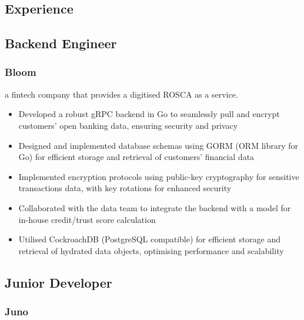 \documentclass{article}
\begin{document}
\begin{paracol}{2}
  \raggedright
  \vspace{3pt}
  \section{Experience}
  \subsection{Backend Engineer}
  \subsubsection{Bloom}
  {\color{LightGrey}\scriptsize\href{https://www.bloommoney.co}{\faExternalLink}}
  \hspace*{\fill}{\color{TitleGrey}{\scriptsize\faCalendar}\hspace{5pt}{\small09/2023 -- Present}}
  
  {\noindent\small a fintech company that provides a digitised ROSCA as a service.}
  \begin{itemize}[leftmargin=*]
    \setlength\itemsep{-2pt}
    \item Developed a robust gRPC backend in Go to seamlessly pull and encrypt customers' open banking data, ensuring security and privacy
    \item Designed and implemented database schemas using GORM (ORM library for Go) for efficient storage and retrieval of customers' financial data
    \item Implemented encryption protocols using public-key cryptography for sensitive transactions data, with key rotations for enhanced security
    \item Collaborated with the data team to integrate the backend with a model for in-house credit/trust score calculation
    \item Utilised CockroachDB (PostgreSQL compatible) for efficient storage and retrieval of hydrated data objects, optimising performance and scalability
  \end{itemize}

  \subsection{Junior Developer}
  \subsubsection{Juno}
  {\color{LightGrey}\scriptsize\href{https://www.juno.legal}{\faExternalLink}}
  \hspace*{\fill}{\color{TitleGrey}{\scriptsize\faCalendar}\hspace{5pt}{\small10/2021 -- 12/2022}}
  

\end{paracol}
\end{document}
